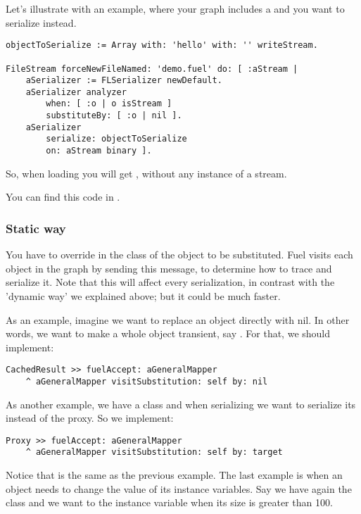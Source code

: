 \documentclass[a4paper,10pt,twoside]{book}
\begin{document}
Let's illustrate with an example, where your graph includes a  and you want to serialize  instead. 

\begin{lstlisting}
objectToSerialize := Array with: 'hello' with: '' writeStream.

FileStream forceNewFileNamed: 'demo.fuel' do: [ :aStream |
    aSerializer := FLSerializer newDefault.
    aSerializer analyzer 
        when: [ :o | o isStream ] 
        substituteBy: [ :o | nil ].
    aSerializer         
        serialize: objectToSerialize
        on: aStream binary ].
\end{lstlisting}

So, when loading you will get , without any instance of a stream.

You can find this code in .

\subsubsection{Static way}

You have to override  in the class of the object to be substituted. Fuel visits each object in the graph by sending this message, to determine how to trace and serialize it. Note that this will affect every serialization, in contrast with the 'dynamic way' we explained above; but it could be much faster.

As an example, imagine we want to replace an object directly with nil. In other words, we want to make a whole object transient, say . For that, we should implement:

\begin{lstlisting}
CachedResult >> fuelAccept: aGeneralMapper
    ^ aGeneralMapper visitSubstitution: self by: nil
\end{lstlisting}

As another example, we have a  class and when serializing we want to serialize its  instead of the proxy. So we implement:

\begin{lstlisting}
Proxy >> fuelAccept: aGeneralMapper
    ^ aGeneralMapper visitSubstitution: self by: target
\end{lstlisting}

Notice that  is the same as the previous example. The last example is when an object needs to change the value of its instance variables. Say we have again the class  and we want to  the instance variable  when its size is greater than 100. 
\end{document}
